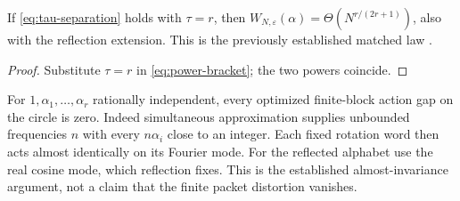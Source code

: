 \begin{corollary}\label{cor:ba}
If \eqref{eq:tau-separation} holds with $\tau=r$, then
$W_{N,\varepsilon}(\alpha)=\Theta(N^{r/(2r+1)})$, also with the reflection extension. This is the previously established matched law \cite{GTF42}.
\end{corollary}
\begin{proof}
Substitute $\tau=r$ in \eqref{eq:power-bracket}; the two powers coincide.
\end{proof}

For $1,\alpha_1,\ldots,\alpha_r$ rationally independent, every optimized finite-block action gap on the circle is zero. Indeed simultaneous approximation supplies unbounded frequencies $n$ with every $n\alpha_i$ close to an integer. Each fixed rotation word then acts almost identically on its Fourier mode. For the reflected alphabet use the real cosine mode, which reflection fixes. This is the established almost-invariance argument, not a claim that the finite packet distortion vanishes.
